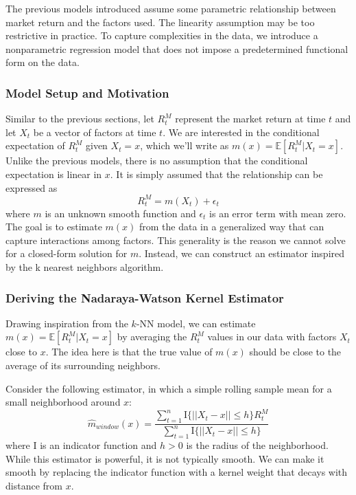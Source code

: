 The previous models introduced assume some parametric relationship between market return and the factors used. The linearity assumption may be too restrictive in practice. To capture complexities in the data, we introduce a nonparametric regression model that does not impose a predetermined functional form on the data.

\subsubsection{Model Setup and Motivation}

Similar to the previous sections, let $R^M_t$ represent the market return at time $t$ and let $X_t$ be a vector of factors at time $t$. We are interested in the conditional expectation of $R^M_t$ given $X_t=x$, which we'll write as $m(x)=\mathbb{E}[R^M_t|X_t=x]$. Unlike the previous models, there is no assumption that the conditional expectation is linear in $x$. It is simply assumed that the relationship can be expressed as $$R_t^M=m(X_t)+\epsilon_t$$ where $m$ is an unknown smooth function and $\epsilon_t$ is an error term with mean zero. The goal is to estimate $m(x)$ from the data in a generalized way that can capture interactions among factors. This generality is the reason we cannot solve for a closed-form solution for $m$. Instead, we can construct an estimator inspired by the k nearest neighbors algorithm.

\subsubsection{Deriving the Nadaraya-Watson Kernel Estimator}

Drawing inspiration from the $k$-NN model, we can estimate $m(x)=\mathbb{E}[R^M_t|X_t=x]$ by averaging the $R^M_t$ values in our data with factors $X_t$ close to $x$. The idea here is that the true value of $m(x)$ should be close to the average of its surrounding neighbors. 

Consider the following estimator, in which a simple rolling sample mean for a small neighborhood around $x$: $$\hat{m}_{window}(x)=\frac{\sum_{t=1}^n\mathrm{I}\{||X_t-x||\leq h\}R_t^M}{\sum_{t=1}^n\mathrm{I}\{||X_t-x||\leq h\}}$$ where $\mathrm{I}$ is an indicator function and $h>0$ is the radius of the neighborhood. While this estimator is powerful, it is not typically smooth. We can make it smooth by replacing the indicator function with a kernel weight that decays with distance from $x$.

